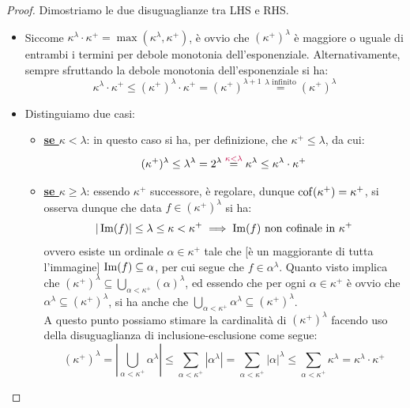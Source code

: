 \begin{proof}
	Dimostriamo le due disuguaglianze tra LHS e RHS.
	\begin{itemize}
		\item[$\boxed{\geq}$] Siccome $\kappa^{\lambda} \cdot \kappa^+ = \max(\kappa^{\lambda}, \kappa^+)$, \`e ovvio che $(\kappa^+)^\lambda$ \`e maggiore o uguale di entrambi i termini per debole monotonia dell'esponenziale. Alternativamente, sempre sfruttando la debole monotonia dell'esponenziale si ha:
		\[ \kappa^\lambda \cdot \kappa^+ \leq (\kappa^+)^{\lambda} \cdot \kappa^+ = (\kappa^+)^{\lambda + 1} \overset{\text{$\lambda$ infinito}}{=}(\kappa^+)^{\lambda}
			\]
		\item[$\boxed{\leq}$] Distinguiamo due casi:
		\begin{itemize}
			\item[$\bullet$]\textbf{\underline{se $\kappa < \lambda$}}: in questo caso si ha, per definizione, che $\kappa^+ \leq \lambda$, da cui:
			\[ (\kappa^+)^\lambda \leq \lambda^\lambda = 2^{\lambda} \overset{\textcolor{purple}{\kappa < \lambda}}{=} \kappa^{\lambda} \leq \kappa^{\lambda}\cdot \kappa^+
				\]
			\item[$\bullet$]\textbf{\underline{se $\kappa \geq \lambda$}}: essendo $\kappa^+$ successore, \`e regolare, dunque $\operatorname{cof}(\kappa^+) = \kappa^+$, si osserva dunque che data $f \in (\kappa^+)^\lambda$ si ha:
			\[ |\operatorname{Im}(f)| \leq \lambda \leq \kappa < \kappa^{+} \implies \text{$\operatorname{Im}(f)$ non cofinale in $\kappa^+$}
				\]
			ovvero esiste un ordinale $\alpha \in \kappa^+$ tale che [\`e un maggiorante di tutta l'immagine] $\operatorname{Im}(f) \subseteq \alpha$, per cui segue che $f \in \alpha^\lambda$. Quanto visto implica che $(\kappa^+)^\lambda \subseteq \bigcup_{\alpha < \kappa^+}(\alpha)^\lambda$, ed essendo che 
			per ogni $\alpha \in \kappa^+$ \`e ovvio che $\alpha^{\lambda} \subseteq (\kappa^+)^\lambda$, si ha anche che $\bigcup_{\alpha < \kappa^+} \alpha^\lambda \subseteq (\kappa^+)^\lambda$.\\
			A questo punto possiamo stimare la cardinalit\`a di $(\kappa^+)^\lambda$ facendo uso della disuguaglianza di inclusione-esclusione come segue:
			\[ (\kappa^+)^\lambda = \left\lvert \bigcup_{\alpha < \kappa^+} \alpha^{\lambda}\right\rvert \leq \sum_{\alpha < \kappa^+} |\alpha^{\lambda}| = \sum_{\alpha < \kappa^+} |\alpha|^{\lambda} \leq \sum_{\alpha < \kappa^+} \kappa^{\lambda} = \kappa^{\lambda} \cdot \kappa^+
				\]
		\end{itemize}
	\end{itemize}
\end{proof}

